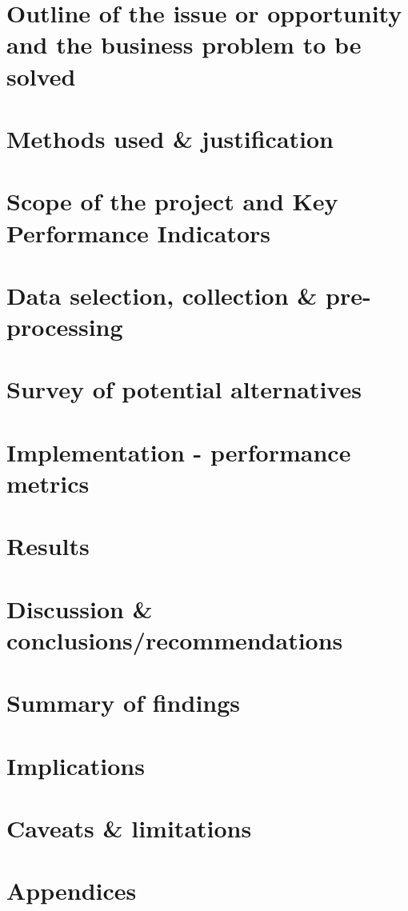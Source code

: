 \documentclass[12pt,a4paper]{article}
\begin{document}
\section{Outline of the issue or opportunity and the business problem to be solved}

\section{Methods used \& justification}

\section{Scope of the project and Key Performance Indicators}

\section{Data selection, collection \& pre-processing}

\section{Survey of potential alternatives}

\section{Implementation - performance metrics}

\section{Results}

\section{Discussion \& conclusions/recommendations}

\section{Summary of findings}

\section{Implications}

\section{Caveats \& limitations}

\section{Appendices}



\end{document}
